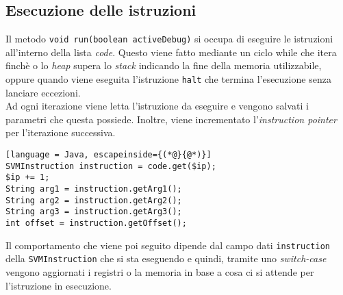 \documentclass[../report.tex]{subfiles}
\begin{document}
\subsection{Esecuzione delle istruzioni}\label{ss:esecuzione-istruzioni}
Il metodo \verb|void run(boolean activeDebug)| si occupa di eseguire le istruzioni all'interno della lista \textit{code}. Questo viene fatto mediante un ciclo while che itera finch\`e o lo \textit{heap} supera lo \textit{stack} indicando la fine della memoria utilizzabile, oppure quando viene eseguita l'istruzione \verb|halt| che termina l'esecuzione senza lanciare eccezioni.\\
Ad ogni iterazione viene letta l'istruzione da eseguire e vengono salvati i parametri che questa possiede.
Inoltre, viene incrementato l'\textit{instruction pointer} per l'iterazione successiva.
\begin{lstlisting}[language = Java, escapeinside={(*@}{@*)}]
SVMInstruction instruction = code.get($ip);
$ip += 1;
String arg1 = instruction.getArg1();
String arg2 = instruction.getArg2();
String arg3 = instruction.getArg3();
int offset = instruction.getOffset();
\end{lstlisting}
Il comportamento che viene poi seguito dipende dal campo dati \verb|instruction| della \verb|SVMInstruction| che si sta eseguendo e quindi, tramite uno \textit{switch-case} vengono aggiornati i registri o la memoria in base a cosa ci si attende per l'istruzione in esecuzione.
\end{document}
